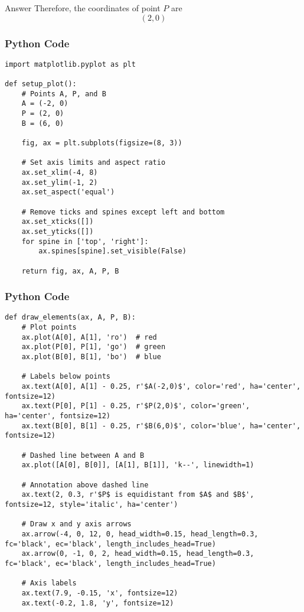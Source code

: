 \documentclass{beamer}
\begin{document}
\begin{frame}{Answer}
Therefore, the coordinates of point \(P\) are
\begin{equation}
    \boxed{(2, 0)}
\end{equation}

\end{frame}

\begin{frame}[fragile]
    \frametitle{Python Code}
    \begin{lstlisting}
import matplotlib.pyplot as plt

def setup_plot():
    # Points A, P, and B
    A = (-2, 0)
    P = (2, 0)
    B = (6, 0)

    fig, ax = plt.subplots(figsize=(8, 3))

    # Set axis limits and aspect ratio
    ax.set_xlim(-4, 8)
    ax.set_ylim(-1, 2)
    ax.set_aspect('equal')

    # Remove ticks and spines except left and bottom
    ax.set_xticks([])
    ax.set_yticks([])
    for spine in ['top', 'right']:
        ax.spines[spine].set_visible(False)

    return fig, ax, A, P, B

\end{lstlisting}
\end{frame}

\begin{frame}[fragile]
    \frametitle{Python Code}
    \begin{lstlisting}
def draw_elements(ax, A, P, B):
    # Plot points
    ax.plot(A[0], A[1], 'ro')  # red
    ax.plot(P[0], P[1], 'go')  # green
    ax.plot(B[0], B[1], 'bo')  # blue

    # Labels below points
    ax.text(A[0], A[1] - 0.25, r'$A(-2,0)$', color='red', ha='center', fontsize=12)
    ax.text(P[0], P[1] - 0.25, r'$P(2,0)$', color='green', ha='center', fontsize=12)
    ax.text(B[0], B[1] - 0.25, r'$B(6,0)$', color='blue', ha='center', fontsize=12)

    # Dashed line between A and B
    ax.plot([A[0], B[0]], [A[1], B[1]], 'k--', linewidth=1)

    # Annotation above dashed line
    ax.text(2, 0.3, r'$P$ is equidistant from $A$ and $B$', fontsize=12, style='italic', ha='center')

    # Draw x and y axis arrows
    ax.arrow(-4, 0, 12, 0, head_width=0.15, head_length=0.3, fc='black', ec='black', length_includes_head=True)
    ax.arrow(0, -1, 0, 2, head_width=0.15, head_length=0.3, fc='black', ec='black', length_includes_head=True)

    # Axis labels
    ax.text(7.9, -0.15, 'x', fontsize=12)
    ax.text(-0.2, 1.8, 'y', fontsize=12)

\end{lstlisting}
\end{frame}
\end{document}
